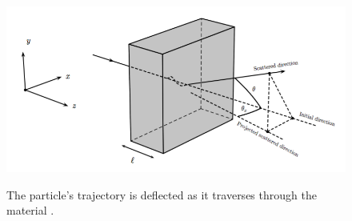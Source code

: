 \begin{figure}[h!]
\centering
	\includegraphics[width=0.5\linewidth]{Figures/mcs_nocap.png} \\
\caption{The particle's trajectory is deflected as it traverses through the material \cite{leonidas1}.}
\end{figure}